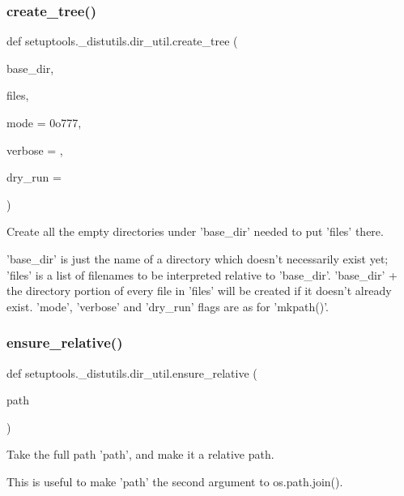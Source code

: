 \subsubsection{\texorpdfstring{create\+\_\+tree()}{create\_tree()}}
{\footnotesize\ttfamily def setuptools.\+\_\+distutils.\+dir\+\_\+util.\+create\+\_\+tree (\begin{DoxyParamCaption}\item[{}]{base\+\_\+dir,  }\item[{}]{files,  }\item[{}]{mode = {\ttfamily 0o777},  }\item[{}]{verbose = {},  }\item[{}]{dry\+\_\+run = {} }\end{DoxyParamCaption})}

\begin{DoxyVerb}Create all the empty directories under 'base_dir' needed to put 'files'
there.

'base_dir' is just the name of a directory which doesn't necessarily
exist yet; 'files' is a list of filenames to be interpreted relative to
'base_dir'.  'base_dir' + the directory portion of every file in 'files'
will be created if it doesn't already exist.  'mode', 'verbose' and
'dry_run' flags are as for 'mkpath()'.
\end{DoxyVerb}
 \mbox{\label{namespacesetuptools_1_1__distutils_1_1dir__util_a551dd5039a40f062536669d5045f691a}} 
\subsubsection{\texorpdfstring{ensure\+\_\+relative()}{ensure\_relative()}}
{\footnotesize\ttfamily def setuptools.\+\_\+distutils.\+dir\+\_\+util.\+ensure\+\_\+relative (\begin{DoxyParamCaption}\item[{}]{path }\end{DoxyParamCaption})}

\begin{DoxyVerb}Take the full path 'path', and make it a relative path.

This is useful to make 'path' the second argument to os.path.join().
\end{DoxyVerb}
 \mbox{\label{namespacesetuptools_1_1__distutils_1_1dir__util_a82c544d263b30ce37020640fa26c5ecf}} 

